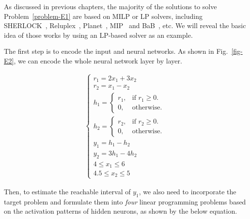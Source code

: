 As discussed in previous chapters, the majority of the solutions to solve Problem~\ref{problem-E1} are based on MILP or LP solvers, including SHERLOCK~\cite{dutta2017output}, Reluplex~\cite{katz2017reluplex}, Planet~\cite{ehlers2017formal1}, MIP~\cite{CNR2017} and BaB~\cite{bunel2017piecewise}, etc. We will reveal the basic idea of those works by using an LP-based solver as an example.

The first step is to encode the input and neural networks. As shown in Fig.~\ref{fig-E2}, we can encode the whole neural network layer by layer.

\begin{equation}\label{eqn-encode}
    \begin{split}
        \begin{cases}
        r_1 = 2x_1 + 3x_2\\
        r_2 = x_1 - x_2\\
        h_1 = \begin{cases}
    r_1, & \text{if $r_1\geq 0$}.\\
    0, & \text{otherwise}.
  \end{cases}\\
  h_2 = \begin{cases}
    r_2, & \text{if $r_2\geq 0$}.\\
    0, & \text{otherwise}.
  \end{cases}\\
  y_1 = h_1 - h_2\\
  y_2 = 3h_1 - 4h_2\\
  4 \leq x_1 \leq 6\\
  4.5 \leq x_2 \leq 5
  \end{cases}
    \end{split}
\end{equation}

Then, to estimate the reachable interval of $y_1$, we also need to incorporate the target problem and formulate them into {\em four} linear programming problems based on the activation patterns of hidden neurons, as shown by the below equation.

